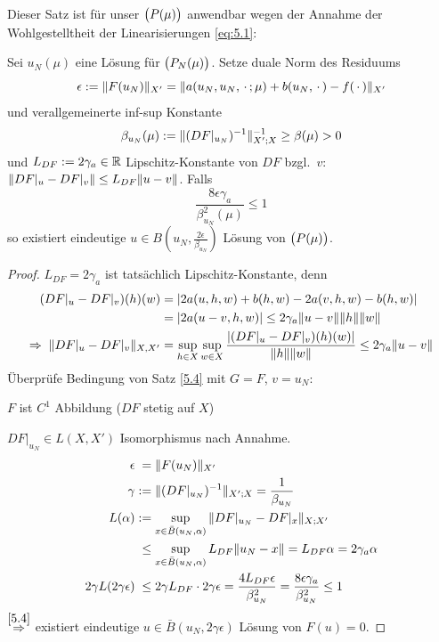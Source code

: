 Dieser Satz ist für unser $\big(P(\mu)\big)$ anwendbar wegen der Annahme der Wohlgestelltheit der Linearisierungen \eqref{eq:5.1}:

\begin{kor} \label{5.5}
	Sei $u_N(\mu)$ eine Lösung für $\big(P_N(\mu)\big)$.
	Setze duale Norm des Residuums
	\begin{equation}
		\epsilon := \|F(u_N)\|_{X'} = \|a(u_N,u_N,\,\cdot\,;\mu)+b(u_N,\,\cdot\,)-f(\,\cdot\,)\|_{X'}
		\label{eq:5.3}
	\end{equation}
	und verallgemeinerte inf-sup Konstante
	\[
		\beta_{u_N}(\mu) := \|(DF|_{u_N})^{-1}\|_{X';X}^{-1} \geq \beta(\mu) > 0
	\]
	und $L_{DF} := 2\gamma_a \in \mathbb{R}$ Lipschitz-Konstante von $DF$ bzgl.\ $v$: $\|DF|_u-DF|_v\| \leq L_{DF} \|u-v\|$.
	Falls
	\[
		\frac{8\epsilon\gamma_a}{\beta_{u_N}^2(\mu)} \leq 1
	\]
	so existiert eindeutige $u \in B(u_N,\frac{2\epsilon}{\beta_{u_N}})$ Lösung von $\big(P(\mu)\big)$.

	\begin{proof}
		$L_{DF} = 2\gamma_a$ ist tatsächlich Lipschitz-Konstante, denn
		\begin{align*}
			(DF|_u-DF|_v)(h)(w) &= |2a(u,h,w)+b(h,w)-2a(v,h,w)-b(h,w)|\\
			&= |2a(u-v,h,w)| \leq 2\gamma_a \|u-v\|\|h\|\|w\|\\
			\Rightarrow \; \|DF|_u-DF|_v\|_{X,X'} &= \sup_{h\in X} \sup_{w\in X} \frac{|(DF|_u-DF|_v)(h)(w)|}{\|h\|\|w\|} \leq 2\gamma_a \|u-v\|
		\end{align*}
		Überprüfe Bedingung von Satz \ref{5.4} mit $G=F$, $v=u_N$:

		$F$ ist $C^1$ Abbildung ($DF$ stetig auf $X$)

		$DF|_{u_N} \in L(X,X')$ Isomorphismus nach Annahme.
		\begin{align*}
			\epsilon &\;= \|F(u_N)\|_{X'}\\
			\gamma &:= \|(DF|_{u_N})^{-1}\|_{X';X} = \frac{1}{\beta_{u_N}}\\
			L(\alpha) &:= \sup_{x\in\bar B(u_N,\alpha)} \|DF|_{u_N}-DF|_x\|_{X;X'}\\
			&\;\leq \sup_{x\in\bar B(u_N,\alpha)} L_{DF} \|u_N-x\| = L_{DF} \alpha = 2\gamma_a \alpha\\
			2\gamma L(2\gamma\epsilon) &\;\leq 2\gamma L_{DF} \cdot 2\gamma\epsilon = \frac{4L_{DF}\epsilon}{\beta_{u_N}^2} = \frac{8\epsilon\gamma_a}{\beta_{u_N}^2} \leq 1
		\end{align*}
		$\stackrel{\ref{5.4}}{\Rightarrow}$ existiert eindeutige $u \in \bar B(u_N,2\gamma\epsilon)$ Lösung von $F(u)=0$.
	\end{proof}
\end{kor}

